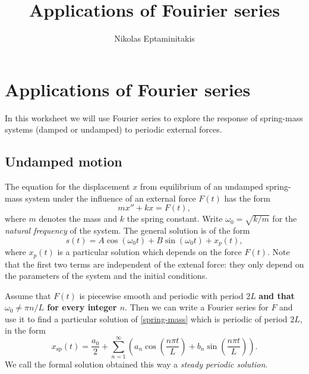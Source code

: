 \documentclass[11pt]{article}
\title{Applications of Fouirier series}
\author{Nikolas Eptaminitakis}
\newcommand{\xsp}{x_{\mathrm{sp}}}
\newcommand{\w}{\omega}
\begin{document}
\section*{Applications of Fourier series}

In this worksheet we will use Fourier series to explore the response of spring-mass systems (damped or undamped) to periodic external forces.

\subsection*{Undamped motion}
The equation for the displacement $x$ from equilibrium of an undamped spring-mass system under the influence of an external force $F(t)$ has the form
\begin{equation}
    mx''+kx=F(t),\label{spring-mass}
\end{equation}
where $m$ denotes the mass and $k$ the spring constant. Write $\w_0=\sqrt{k/m}$ for the \textit{natural frequency}  of the system.
The general solution is of the form 
\begin{equation}
    s(t)=A\cos(\w _0 t)+B\sin(\w _0 t)+x_p(t),
\end{equation}
where $x_p(t)$ is a particular solution which depends on the force $F(t)$. Note that the first two terms are independent of the extenal force: they only depend on the parameters of the system and the initial conditions.

Assume that $F(t)$ is piecewise smooth and periodic with period $2L$ \textbf{and that 
$\w_0\neq \pi n/L$ for every integer $n.$} Then we can write a Fourier series for $F$ and use it to find a particular solution of \eqref{spring-mass} which is periodic of period $2L$, in the form
\begin{equation}
    \xsp(t) =\frac{a_0}{2}+\sum_{n=1}^\infty\left( a_n \cos\left(\frac{n\pi t}{L}\right)+b_n \sin\left(\frac{n\pi t}{L}\right)\right). \label{fourier}
\end{equation}
We call the formal solution obtained this way a \textit{steady periodic solution}. 

    
\end{document}
